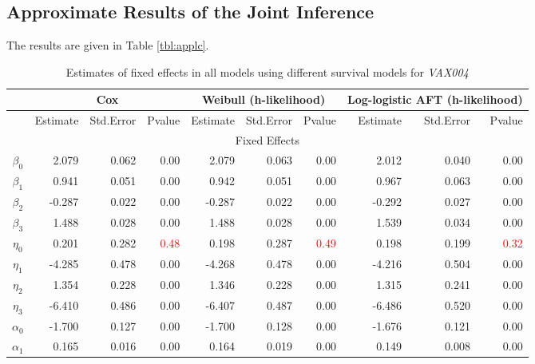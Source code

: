 \subsection{Approximate Results of the Joint Inference}


The results are given in Table \ref{tbl:applc}.

\begin{table}[ht]
\centering
\caption{Estimates of fixed effects in all models using different survival models for \textit{VAX004}}
\begin{tabular}{c|rrr|rrr|rrr}
  \hline
  \multirow{2}{*}{} &  \multicolumn{3}{c|}{Cox} &  \multicolumn{3}{c|}{Weibull (h-likelihood)}   &  \multicolumn{3}{c}{Log-logistic AFT (h-likelihood)} \\
   \hline
   & Estimate & Std.Error & Pvalue & Estimate & Std.Error & Pvalue & Estimate & Std.Error & Pvalue \\ 
  \hline
  \multicolumn{10}{c}{Fixed Effects} \\
  \hline
  $\beta_0$ & 2.079 & 0.062 & 0.00 & 2.079 & 0.063 & 0.00 & 2.012 & 0.040 & 0.00 \\ 
  $\beta_1$ & 0.941 & 0.051 & 0.00 & 0.942 & 0.051 & 0.00 & 0.967 & 0.063 & 0.00 \\ 
  $\beta_2$ & -0.287 & 0.022 & 0.00 & -0.287 & 0.022 & 0.00 & -0.292 & 0.027 & 0.00 \\ 
  $\beta_3$ & 1.488 & 0.028 & 0.00 & 1.488 & 0.028 & 0.00 & 1.539 & 0.034 & 0.00 \\ 
  \hline
  $\eta_0$ & 0.201 & 0.282 & \textcolor{red}{0.48} & 0.198 & 0.287 & \textcolor{red}{0.49} & 0.198 & 0.199 & \textcolor{red}{0.32} \\ 
  $\eta_1$ & -4.285 & 0.478 & 0.00 & -4.268 & 0.478 & 0.00 & -4.216 & 0.504 & 0.00 \\ 
  $\eta_2$ & 1.354 & 0.228 & 0.00 & 1.346 & 0.228 & 0.00 & 1.315 & 0.241 & 0.00 \\ 
  $\eta_3$ & -6.410 & 0.486 & 0.00 & -6.407 & 0.487 & 0.00 & -6.486 & 0.520 & 0.00 \\ 
  \hline
  $\alpha_0$ & -1.700 & 0.127 & 0.00 & -1.700 & 0.128 & 0.00 & -1.676 & 0.121 & 0.00 \\ 
  $\alpha_1$ & 0.165 & 0.016 & 0.00 & 0.164 & 0.019 & 0.00 & 0.149 & 0.008 & 0.00 \\ 

\end{tabular}
\end{table}
